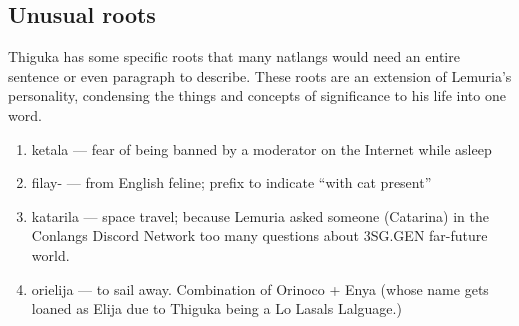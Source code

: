 \subsection{Unusual roots}
Thiguka has some specific roots that many natlangs would need an entire sentence or even paragraph to describe.
These roots are an extension of Lemuria's personality, condensing the things and concepts of significance to his life into one word.

\begin{enumerate}
    \item ketala --- fear of being banned by a moderator on the Internet while asleep
    \item filay- --- from English feline; prefix to indicate ``with cat present''
    \item katarila --- space travel; because Lemuria asked someone (Catarina) in the Conlangs Discord Network too many questions about 3SG.GEN far-future world.
    \item orielija --- to sail away. Combination of Orinoco + Enya (whose name gets loaned as Elija due to Thiguka being a Lo Lasals Lalguage.)
\end{enumerate}